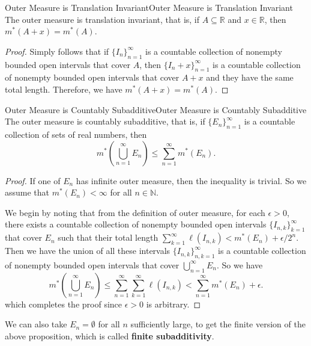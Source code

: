 \documentclass[../main.tex]{subfiles}
\begin{document}
\begin{proposition}{Outer Measure is Translation Invariant}{Outer Measure is Translation Invariant}
  The outer measure is translation invariant, that is, if $A \subseteq \mathbb{R}$ and $x \in \mathbb{R}$, then $m^*(A + x) = m^*(A)$.
\end{proposition}
\begin{proof}
  Simply follows that if $\{I_n\}_{n=1}^{\infty}$ is a countable collection of nonempty bounded open intervals that cover $A$, then $\{I_n + x\}_{n=1}^{\infty}$ is a countable collection of nonempty bounded open intervals that cover $A + x$ and they have the same total length. Therefore, we have $m^*(A + x) = m^*(A)$.
\end{proof}

\begin{proposition}{Outer Measure is Countably Subadditive}{Outer Measure is Countably Subadditive}
  The outer measure is countably subadditive, that is, if $\{E_n\}_{n=1}^{\infty}$ is a countable collection of sets of real numbers, then
  \begin{equation}
    m^*\left(\bigcup_{n=1}^{\infty} E_n\right) \leq \sum_{n=1}^{\infty} m^*(E_n).
  \end{equation}
\end{proposition}
\begin{proof}
  If one of $E_n$ has infinite outer measure, then the inequality is trivial. So we assume that $m^*(E_n) < \infty$ for all $n \in \mathbb{N}$.

  We begin by noting that from the definition of outer measure, for each $\epsilon > 0$, there exists a countable collection of nonempty bounded open intervals $\{I_{n, k}\}_{k=1}^{\infty}$ that cover $E_n$ such that their total length $\sum_{k=1}^{\infty} \ell(I_{n, k}) < m^*(E_n) + \epsilon/2^n$. Then we have the union of all these intervals $\{I_{n, k}\}_{n, k=1}^{\infty}$ is a countable collection of nonempty bounded open intervals that cover $\bigcup_{n=1}^{\infty} E_n$. So we have
  \begin{equation*}
    m^*\left(\bigcup_{n=1}^{\infty} E_n\right) \leq \sum_{n=1}^{\infty} \sum_{k=1}^{\infty} \ell(I_{n, k}) < \sum_{n=1}^{\infty} m^*(E_n) + \epsilon.
  \end{equation*}
  which completes the proof since $\epsilon > 0$ is arbitrary.
\end{proof}

We can also take $E_n = \emptyset $ for all $n$ sufficiently large, to get the finite version of the above proposition, which is called \textbf{finite subadditivity}.
\end{document}
